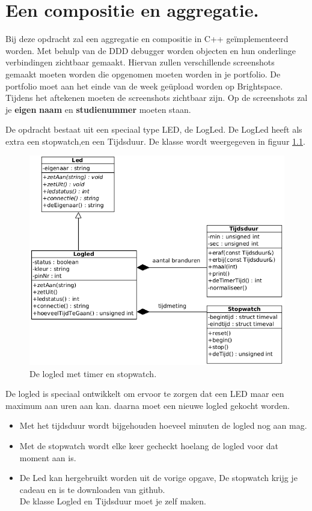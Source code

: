 \chapter{Een compositie en aggregatie.}
\label{ch:hfstCompAgg}
Bij deze opdracht zal een aggregatie en compositie in C++ geïmplementeerd worden. Met behulp van de DDD debugger worden objecten en hun onderlinge verbindingen zichtbaar gemaakt. Hiervan zullen verschillende screenshots gemaakt moeten worden die opgenomen  moeten worden in je portfolio. De portfolio moet aan het einde van de week geüpload worden op Brightspace. Tijdens het aftekenen moeten de screenshots zichtbaar zijn.
Op de screenshots zal je \textbf{eigen} \textcolor{BrickRed}{\textbf{naam}} en \textcolor{BrickRed}{\textbf{studienummer}} moeten staan.

De opdracht bestaat uit een speciaal type LED, de LogLed. De LogLed heeft als extra een stopwatch,en een Tijdsduur. De klasse wordt weergegeven in figuur \ref{fig:logled}.
    \begin{figure}[h!]
	\captionsetup{justification=centering}
	\includegraphics[width=0.9 \linewidth]{figuren/logled}      %
\centering
\caption{De logled met timer en stopwatch.}
\label{fig:logled}
\end{figure} 
De logled is speciaal ontwikkelt om ervoor te zorgen dat een LED maar een maximum aan uren aan kan. daarna moet een nieuwe logled gekocht worden. 
\begin{itemize}
	\item Met het tijdsduur wordt bijgehouden hoeveel minuten de logled nog aan mag. 
	\item Met de stopwatch wordt elke keer gecheckt hoelang de logled voor dat moment aan is.
	\item De Led kan hergebruikt worden uit de vorige opgave, De stopwatch krijg je cadeau en is te downloaden van github. \\De klasse Logled en Tijdsduur moet je zelf maken.
\end{itemize}

